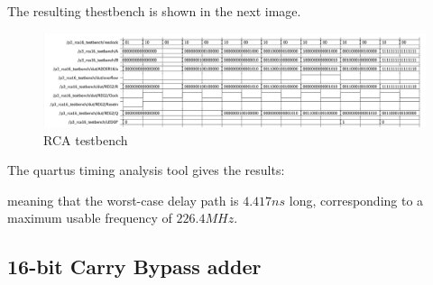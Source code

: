 \documentclass[12pt]{article}
\begin{document}
The resulting thestbench is shown in the next image.

 \begin{figure}[!h]
	\centering
	\includegraphics[scale = 0.55]{immagini/niki/testbench1.png}
	\caption{RCA testbench}       
\end{figure}
\newpage
The quartus timing analysis tool gives the results:
 \begin{figure}[!h]
 	\centering
 \begin{subfigure}{\linewidth}	
 	\centering
 \end{subfigure}

\end{figure}

meaning that the worst-case delay path is $4.417 ns $ long, corresponding to a maximum usable frequency of $226.4MHz$.

\subsection{16-bit Carry Bypass adder}
\end{document}
